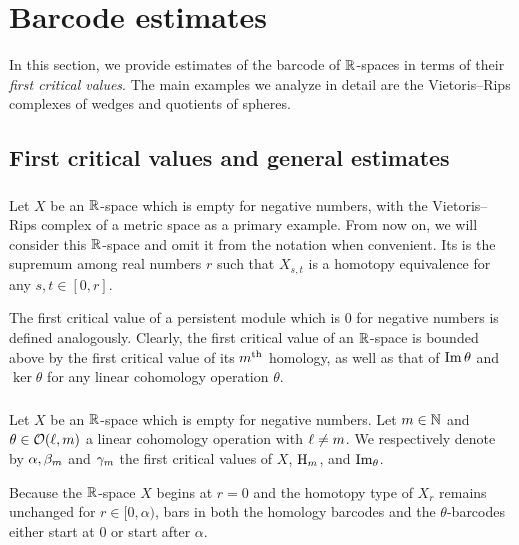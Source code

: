 
\section{Barcode estimates}\label{s:computations}

In this section, we provide estimates of the barcode of $\mathbb{R}$-spaces in terms of their \textit{first critical values}.
The main examples we analyze in detail are the Vietoris--Rips complexes of wedges and quotients of spheres.

\subsection{First critical values and general estimates}\label{sub:general_barcodes}

\subsubsection{}\label{subsub:first_critical_value}

Let $X$ be an $\mathbb{R}$-space which is empty for negative numbers, with the Vietoris--Rips complex of a metric space as a primary example.
From now on, we will consider this $\mathbb{R}$-space and omit it from the notation when convenient.
Its  is the supremum among real numbers $r$ such that $X_{s,t}$ is a homotopy equivalence for any $s,t \in [0,r]$.

The first critical value of a persistent module which is \(0\) for negative numbers is defined analogously.
Clearly, the first critical value of an $\mathbb{R}$-space is bounded above by the first critical value of its $m^{\mathrm{th}}$ homology, as well as that of \(\operatorname{Im}\theta\) and \(\ker\theta\) for any linear cohomology operation $\theta$.

\subsubsection{}\label{subsub:barcode_general}

Let $X$ be an $\mathbb{R}$-space which is empty for negative numbers.
Let \(m \in \mathbb{N}\) and \(\theta \in \mathcal{O}(\ell,m)\) a linear cohomology operation with \(\ell \neq m\).
We respectively denote by $\alpha, \beta_m$ and $\gamma_m$ the first critical values of $X$, \(\mathrm{H}_m\), and \(\operatorname{Im}_\theta\).

Because the $\mathbb{R}$-space $X$ begins at $r=0$ and the homotopy type of $X_r$ remains unchanged for $r\in [0,\alpha)$, bars in both the homology barcodes and the $\theta$-barcodes either start at $0$ or start after $\alpha$.

